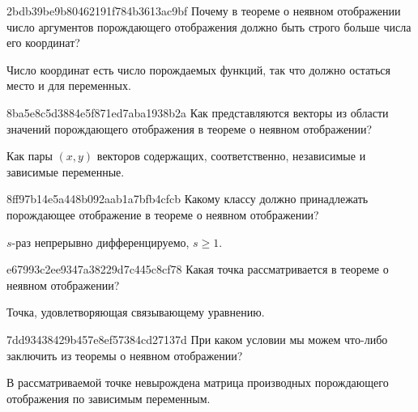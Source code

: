 \begin{note}{2bdb39be9b80462191f784b3613ac9bf}
    Почему в теореме о неявном отображении число аргументов порождающего отображения должно быть строго больше числа его координат?

    \begin{cloze}{1}
        Число координат есть число порождаемых функций, так что должно остаться место и для переменных.
    \end{cloze}
\end{note}

\begin{note}{8ba5e8c5d3884e5f871ed7aba1938b2a}
    Как представляются векторы из области значений порождающего отображения в теореме о неявном отображении?

    \begin{cloze}{1}
        Как пары \({ (x, y) }\) векторов содержащих, соответственно, независимые и зависимые переменные.
    \end{cloze}
\end{note}

\begin{note}{8ff97b14e5a448b092aab1a7bfb4cfcb}
    Какому классу должно принадлежать порождающее отображение в теореме о неявном отображении?

    \begin{cloze}{1}
        \({ s }\)-раз непрерывно дифференцируемо, \({ s \geqslant 1 }\).
    \end{cloze}
\end{note}

\begin{note}{e67993c2ee9347a38229d7c445c8cf78}
    Какая точка рассматривается в теореме о неявном отображении?

    \begin{cloze}{1}
        Точка, удовлетворяющая связывающему уравнению.
    \end{cloze}
\end{note}

\begin{note}{7dd93438429b457e8ef57384cd27137d}
    При каком условии мы можем что-либо заключить из теоремы о неявном отображении?

    \begin{cloze}{1}
        В рассматриваемой точке невырождена матрица производных порождающего отображения по зависимым переменным.
    \end{cloze}
\end{note}

